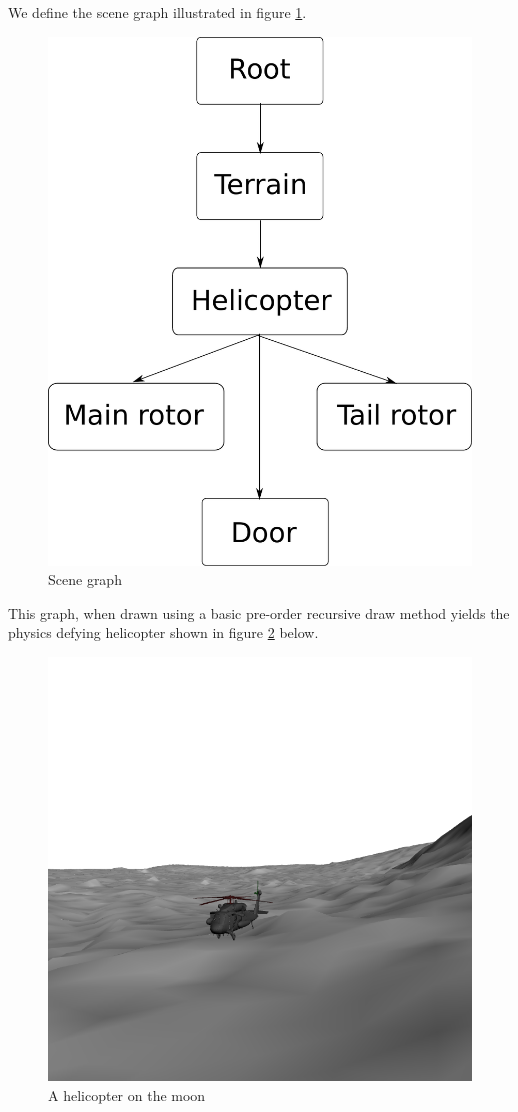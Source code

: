 \documentclass[]{article}
\begin{document}
\begin{multicols}{2}
\section{}
\setcounter{subsection}{2}
\subsection{}
We define the scene graph illustrated in figure \ref{fig:scene-graph}.
\begin{figure}[H]
\centering
\includegraphics[width=0.5\columnwidth]{scenegraph}
\caption{Scene graph}
\label{fig:scene-graph}
\end{figure}
This graph, when drawn using a basic pre-order recursive draw method yields the physics defying helicopter shown in figure \ref{fig:chopper} below.

\begin{figure}[H]
\centering
\includegraphics[width=0.5\columnwidth]{chopper}
\caption{A helicopter on the moon}
\label{fig:chopper}
\end{figure}


\setcounter{section}{4}
\section{}

\end{multicols}
\end{document}
